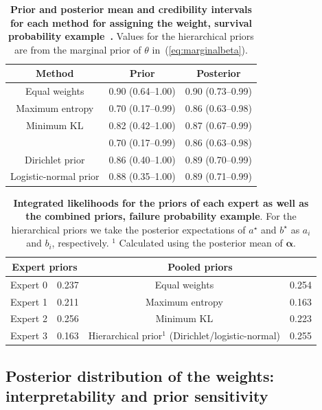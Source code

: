 \documentclass[a4paper, notitlepage, 10pt]{article}
\begin{document}
\begin{table}[ht]
\caption{\textbf{Prior and posterior mean and credibility intervals for each method for assigning the weight, survival probability example~\citep{Savchuk1994}.}
Values for the hierarchical priors are from the marginal prior of $\theta$ in~(\ref{eq:marginalbeta}).
}
\centering
\begin{tabular}{ccc}
 \hline
Method & Prior & Posterior  \\ 
 \hline
 Equal weights & 0.90 (0.64--1.00) & 0.90 (0.73--0.99) \\ 
 Maximum entropy &  0.70 (0.17--0.99) & 0.86 (0.63--0.98) \\ 
 Minimum KL  &  0.82 (0.42--1.00) & 0.87 (0.67--0.99) \\ 
 \cite{Rufo2012B} & 0.70 (0.17--0.99) & 0.86 (0.63--0.98)\\
 Dirichlet prior & 0.86 (0.40--1.00) & 0.89 (0.70--0.99) \\ 
 Logistic-normal prior & 0.88 (0.35--1.00) & 0.89 (0.71--0.99) \\ 
  \hline
\end{tabular}
\label{tab:prior_posteriorsSavchuk}
\end{table}


\begin{table}[ht]
\caption{\textbf{Integrated likelihoods for the priors of each expert as well as the combined priors, failure probability example}.
For the hierarchical priors we take the posterior expectations of $a^\star$ and $b^\star$ as $a_i$ and $b_i$, respectively.
$^1$ Calculated using the posterior mean of $\boldsymbol\alpha$. }
\centering
\begin{tabular}{cccc}
   \hline
   \multicolumn{2}{c}{Expert priors} &  \multicolumn{2}{c}{Pooled priors} \\
   \hline
   Expert 0 & 0.237 & Equal weights & 0.254\\
   Expert 1 & 0.211 & Maximum entropy & 0.163 \\
   Expert 2 & 0.256 & Minimum KL & 0.223 \\ 
   Expert 3 & 0.163 & Hierarchical prior$^1$ (Dirichlet/logistic-normal) & 0.255 \\
   \hline
\end{tabular}
\label{tab:marglikes}
\end{table}

\subsection{Posterior distribution of the weights: interpretability and prior sensitivity}
\label{sec:learning_rate}
\end{document}
